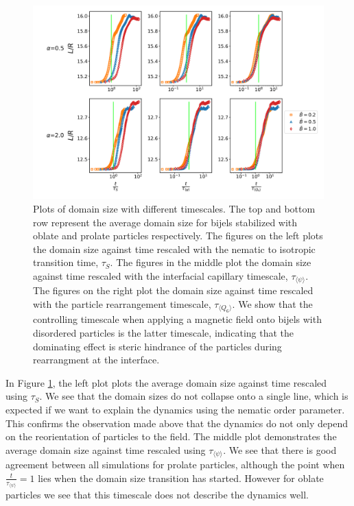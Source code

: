 \begin{figure} 
\centering 
\includegraphics[scale=0.4]{../figures/results/paper2/domain_size-field_on-scaled.png} 
\caption{Plots of domain size with different timescales. The top and bottom row represent the average domain size for bijels stabilized with oblate and prolate particles respectively. The figures on the left plots the domain size against time rescaled with the nematic to isotropic transition time, $\tau_S$. The figures in the middle plot the domain size against time rescaled with the interfacial capillary timescale, $\tau_{\langle \psi \rangle}$. The figures on the right plot the domain size against time rescaled with the particle rearrangement timescale, $\tau_{\langle Q_6 \rangle}$. We show that the controlling timescale when applying a magnetic field onto bijels with disordered particles is the latter timescale, indicating that the dominating effect is steric hindrance of the particles during rearrangment at the interface.} 
\label{fig:domain_size-field_on-scaled} 
\end{figure}

In Figure \ref{fig:domain_size-field_on-scaled}, the left plot plots the
average domain size against time rescaled using \(\tau_S\). We see that
the domain sizes do not collapse onto a single line, which is expected
if we want to explain the dynamics using the nematic order parameter.
This confirms the observation made above that the dynamics do not only
depend on the reorientation of particles to the field. The middle plot
demonstrates the average domain size against time rescaled using
\(\tau_{\langle \psi \rangle}\). We see that there is good agreement
between all simulations for prolate particles, although the point when
\(\frac{t}{\tau_{\langle \psi \rangle}} = 1\) lies when the domain size
transition has started. However for oblate particles we see that this
timescale does not describe the dynamics well.


